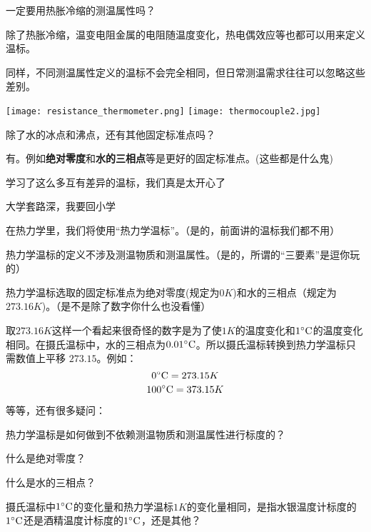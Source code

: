 \documentclass[CJK]{beamer}
\begin{document}
\begin{frame}
\bch
一定要用热胀冷缩的测温属性吗？

\skipline

\bitem
\item{除了热胀冷缩，温变电阻金属的电阻随温度变化，热电偶效应等也都可以用来定义温标。}
\item{同样，不同测温属性定义的温标不会完全相同，但日常测温需求往往可以忽略这些差别。}
\eitem

\bcenter
\texttt{[image: resistance\_thermometer.png]}\hspace{0.1in}
\texttt{[image: thermocouple2.jpg]}
\ecenter
\ech
\end{frame}


\begin{frame}
\bch
除了水的冰点和沸点，还有其他固定标准点吗？

\skipline

\bitem
\item{有。例如{\bf 绝对零度}和{\bf 水的三相点}等是更好的固定标准点。(\wulian 这些都是什么鬼)}
\eitem

\ech
\end{frame}

\begin{frame}
\bch
学习了这么多互有差异的温标，我们真是太开心了\wulian

\skipline

大学套路深，我要回小学\bye

\ech
\end{frame}

\begin{frame}
\bch
\bitem
\item{在热力学里，我们将使用“热力学温标”。（是的，前面讲的温标我们都不用\bye）}
\item{热力学温标的定义不涉及测温物质和测温属性。（是的，所谓的“三要素”是逗你玩的\bye）}
\item{热力学温标选取的固定标准点为绝对零度(规定为$0K$)和水的三相点（规定为$273.16K$)。（是不是除了数字你什么也没看懂\bye）}
\eitem

取$273.16K$这样一个看起来很奇怪的数字是为了使$1K$的温度变化和$1^\circ \mathrm{C}$的温度变化相同。在摄氏温标中，水的三相点为$0.01^\circ \mathrm{C}$。所以摄氏温标转换到热力学温标只需数值上平移
$273.15$。例如： 
$$0^\circ \mathrm{C} = 273.15 K$$
$$100^\circ \mathrm{C} = 373.15K$$

\ech
\end{frame}


\begin{frame}
\bch
等等，还有很多疑问：
\bitem
\item{热力学温标是如何做到不依赖测温物质和测温属性进行标度的？}
\item{什么是绝对零度？}
\item{什么是水的三相点？}
\item{摄氏温标中$1^\circ \mathrm{C}$的变化量和热力学温标$1K$的变化量相同，是指水银温度计标度的$1^\circ \mathrm{C}$还是酒精温度计标度的$1^\circ \mathrm{C}$，还是其他？}
\eitem
\ech
\end{frame}
\end{document}
